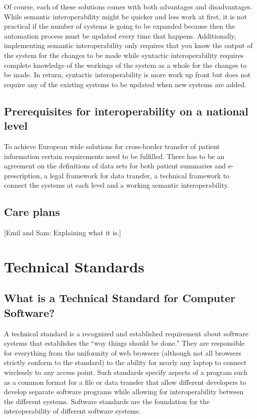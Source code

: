\documentclass[14pt]{article}
\begin{document}
Of course, each of these solutions comes with both advantages and disadvantages.  While semantic interoperability might be quicker and less work at first, it is not practical if the number of systems is going to be expanded because then the automation process must be updated every time that happens.  Additionally, implementing semantic interoperability only requires that you know the output of the system for the changes to be made while syntactic interoperability requires complete knowledge of the workings of the system as a whole for the changes to be made.  In return, syntactic interoperability is more work up front but does not require any of the existing systems to be updated when new systems are added.

\subsection{Prerequisites for interoperability on a national level}

To achieve European wide solutions for cross-border transfer of patient information certain requirements need to be fulfilled. There has to be an agreement on the definitions of data sets for both patient summaries and e-prescription, a legal framework for data transfer, a technical framework to connect the systems at each level and a working semantic \gls{interoperability}. \cite{epSOS1}

\subsection{Care plans}
[Emil and Sam: Explaining what it is.]

\newpage

\section{Technical Standards}
\label{sec:TechnicalStandards}

\subsection{What is a Technical Standard for Computer Software?}
A technical standard is a recognized and established requirement about software systems that establishes the ``way things should be done." They are responsible for everything from the uniformity of web browsers (although not all browsers strictly conform to the standard) to the ability for nearly any laptop to connect wirelessly to any access point. Such standards specify aspects of a program such as a common format for a file or data transfer that allow different developers to develop separate software programs while allowing for \gls{interoperability} between the different systems. Software standards are the foundation for the \gls{interoperability} of different software systems.
\end{document}
